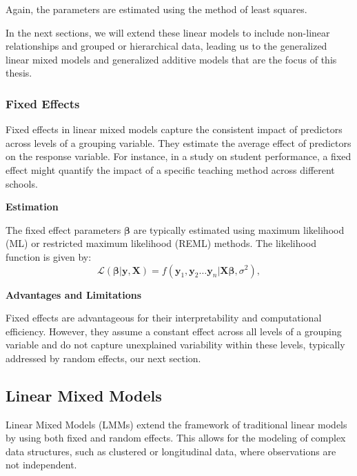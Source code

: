 \documentclass[12pt, twoside,hidelinks]{article}
\theoremstyle{definition}
\numberwithin{equation}{section}
\begin{document}
Again, the parameters are estimated using the method of least squares.
\newline

In the next sections, we will extend these linear models to include non-linear relationships and grouped or hierarchical data, leading us to the generalized linear mixed models and generalized additive models that are the focus of this thesis.


\subsubsection{Fixed Effects}
Fixed effects in linear mixed models capture the consistent impact of predictors across levels of a grouping variable. They estimate the average effect of predictors on the response variable. For instance, in a study on student performance, a fixed effect might quantify the impact of a specific teaching method across different schools.

\textbf{Estimation}

The fixed effect parameters $\boldsymbol{\beta}$ are typically estimated using maximum likelihood (ML) or restricted maximum likelihood (REML) methods. The likelihood function is given by:
\begin{equation}
\mathcal{L}(\boldsymbol{\beta} | \mathbf{y}, \mathbf{X}) = f(\mathbf{y}_1, \mathbf{y}_2  \ldots \mathbf{y}_n | \mathbf{X}\boldsymbol{\beta}, \sigma^2),
\label{eq:likelihood_function}
\end{equation}
\newline

\textbf{Advantages and Limitations}


Fixed effects are advantageous for their interpretability and computational efficiency. However, they assume a constant effect across all levels of a grouping variable and do not capture unexplained variability within these levels, typically addressed by random effects, our next section.



\subsection{Linear Mixed Models}
Linear Mixed Models (LMMs) extend the framework of traditional linear models by using both fixed and random effects. This allows for the modeling of complex data structures, such as clustered or longitudinal data, where observations are not independent.
\newline 
\end{document}
